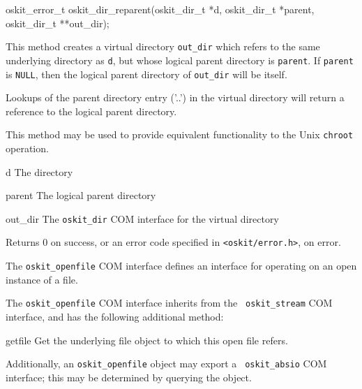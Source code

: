 \begin{apisyn}

	\funcproto oskit_error_t
	oskit_dir_reparent(oskit_dir_t *d, oskit_dir_t *parent,
			  \outparam oskit_dir_t **out_dir);

\end{apisyn}
\ostofs
\begin{apidesc}
	This method creates a virtual directory {\tt out_dir}
	which refers to the same underlying directory as {\tt d}, 
	but whose logical parent directory is {\tt parent}.
	If {\tt parent} is {\tt NULL}, then the logical parent
	directory of {\tt out_dir} will be itself.

	Lookups of the parent directory entry ('..') in the virtual
	directory will return a reference to the logical parent
	directory.

	This method may be used to provide equivalent
	functionality to the Unix {\tt chroot} operation.
\end{apidesc}
\begin{apiparm}
	\item[d]
		The directory 
	\item[parent]
		The logical parent directory
	\item[out_dir]
		The {\tt oskit_dir} COM interface for the virtual directory
\end{apiparm}
\begin{apiret}
	Returns 0 on success, or an error code specified in
	{\tt <oskit/error.h>}, on error.
\end{apiret}



	The {\tt oskit_openfile} COM interface defines an interface for
operating on an open instance of a file.

	The {\tt oskit_openfile} COM interface inherits from the {\tt
oskit_stream} COM interface, and has the following additional method:
\begin{icsymlist}
\item[getfile]
	Get the underlying file object to which this open file refers.
\end{icsymlist}

	Additionally, an {\tt oskit_openfile} object may export a {\tt
oskit_absio} COM interface; this may be determined by querying the
object.

